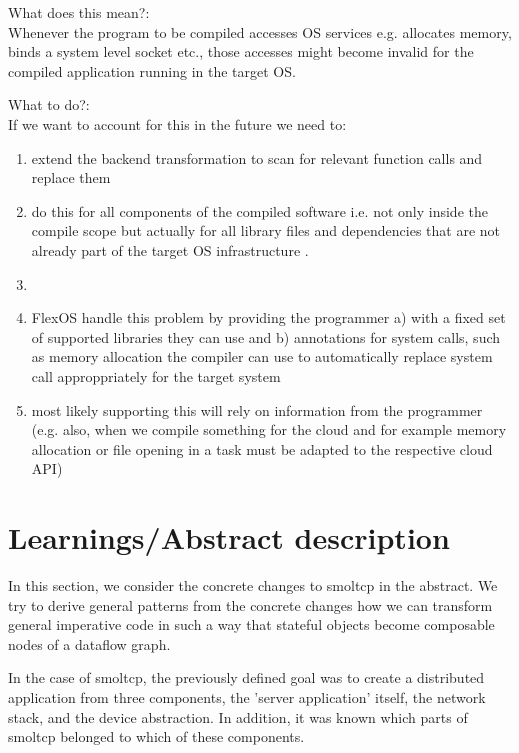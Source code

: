 What does this mean?:\\
Whenever the program to be compiled accesses OS services e.g. allocates memory, binds a system level socket etc., those accesses might become invalid for the compiled application running in the target OS.\\
\bigskip

What to do?:\\
If we want to account for this in the future we need to:
\begin{enumerate}
    \item extend the backend transformation to scan for relevant function calls and replace them
    \item do this for all components of the compiled software i.e. not only inside the compile scope but actually for all library files and dependencies that are not already part of the target OS infrastructure
    .  
    \item {}
    \item FlexOS  handle this problem by providing the programmer a) with a fixed set of supported libraries they can use and b) annotations for system calls, such as memory allocation the compiler can use to automatically replace system call approppriately for the target system
    \item \means most likely supporting this will rely on information from the programmer (e.g. also, when we compile something for the cloud and for example memory allocation or file opening in a task must be adapted to the respective cloud API)
\end{enumerate}


\section{Learnings/Abstract description}
In this section, we consider the concrete changes to smoltcp in the abstract. We try to derive general patterns from the concrete changes how we can transform general imperative code in such a way that stateful objects become composable nodes of a dataflow graph. 

In the case of smoltcp, the previously defined goal was to create a distributed application from three components, the 'server application' itself, the network stack, and the device abstraction. In addition, it was known which parts of smoltcp belonged to which of these components.


